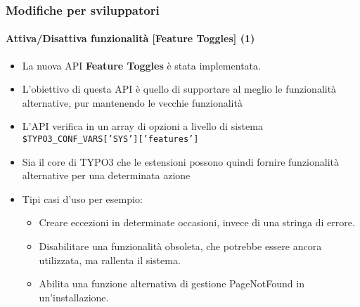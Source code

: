 
\begin{frame}[fragile]
	\frametitle{Modifiche per sviluppatori}
	\framesubtitle{Attiva/Disattiva funzionalità [Feature Toggles] (1)}

	\begin{itemize}
		\item La nuova API \textbf{Feature Toggles} è stata implementata.
		\item L'obiettivo di questa API è quello di supportare al meglio le funzionalità alternative,
			pur mantenendo le vecchie funzionalità
		\item L'API verifica in un array di opzioni a livello di sistema\newline
			\small
				\texttt{\$TYPO3\_CONF\_VARS['SYS']['features']}
			\normalsize
		\item Sia il core di TYPO3 che le estensioni possono quindi fornire
			funzionalità alternative per una determinata azione
		\item Tipi casi d'uso per esempio:
			\smaller
			\begin{itemize}
				\item Creare eccezioni in determinate occasioni, invece di una stringa di errore.
				\item Disabilitare una funzionalità obsoleta, che potrebbe essere ancora utilizzata,
					ma rallenta il sistema.
				\item Abilita una funzione alternativa di gestione PageNotFound in un'installazione.
			\end{itemize}
			\normalsize

	\end{itemize}

\end{frame}


